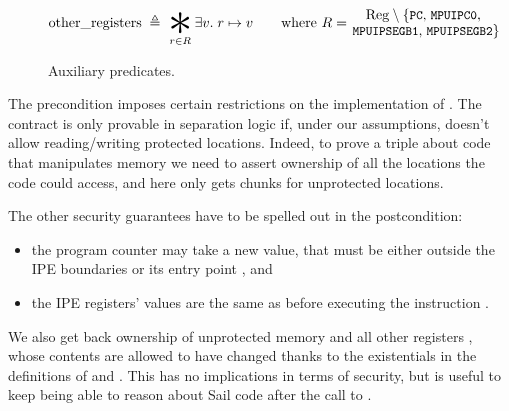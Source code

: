 \begin{figure}
\begin{align*}
    &\pred{other\_registers} \;\triangleq\;
      \bigast_{\mathclap{r \in R}} \exists v.\; r \ptor v
      \qquad \text{where}~R = \substack{
          \displaystyle \mathrm{\small Reg} \setminus \left\{ \text{\small \reg{PC}, \reg{MPUIPC0}}, \right. \\
          \displaystyle \left. \text{\small\reg{MPUIPSEGB1}, \reg{MPUIPSEGB2}}\right\}}
  \end{align*}
  \caption{Auxiliary predicates.}
  \label{fig:aux-preds}
\end{figure}

The precondition imposes certain restrictions on the implementation of . The contract is only provable in separation logic if, under our assumptions,  doesn't allow reading/writing protected locations. Indeed, to prove a triple about code that manipulates memory we need to assert ownership of all the locations the code could access, and here  only gets chunks for unprotected locations.


The other security guarantees have to be spelled out in the postcondition:
\begin{itemize}
\item the program counter may take a new value, that must be either outside the IPE boundaries or its entry point , and
\item the IPE registers' values are the same as before executing the instruction .
\end{itemize}
We also get back ownership of unprotected memory and all other registers , whose contents are allowed to have changed thanks to the existentials in the definitions of  and . This has no implications in terms of security, but is useful to keep being able to reason about Sail code after the call to .

